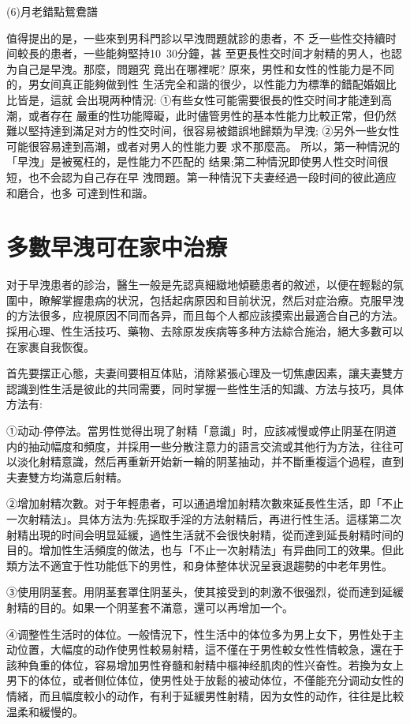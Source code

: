 \documentclass[12pt,UTF8]{ctexbook}
\begin{document}
(6)月老錯點鴛鴦譜

值得提出的是，一些來到男科門診以早洩問題就診的患者，不
乏一些性交持續时间較長的患者，一些能夠堅持10~30分鐘，甚
至更長性交时间才射精的男人，也認为自己是早洩。那麼，問題究
竟出在哪裡呢?
原來，男性和女性的性能力是不同的，男女间真正能夠做到性
生活完全和諧的很少，以性能力为標準的錯配婚姻比比皆是，這就
会出現两种情況:
①有些女性可能需要很長的性交时间才能達到高潮，或者存在
嚴重的性功能障礙，此时儘管男性的基本性能力比較正常，但仍然
難以堅持達到滿足对方的性交时间，很容易被錯誤地歸類为早洩;
②另外一些女性可能很容易達到高潮，或者对男人的性能力要
求不那麼高。
所以，第一种情況的「早洩」是被冤枉的，是性能力不匹配的
结果;第二种情況即使男人性交时间很短，也不会認为自己存在早
洩問題。第一种情況下夫妻经過一段时间的彼此適应和磨合，也多
可達到性和諧。

\section{多數早洩可在家中治療}

对于早洩患者的診治，醫生一般是先認真細緻地傾聽患者的敘述，以便在輕鬆的氛圍中，瞭解掌握患病的状況，包括起病原因和目前状況，然后对症治療。克服早洩的方法很多，应視原因不同而各异，而且每个人都应該摸索出最適合自己的方法。採用心理、性生活技巧、藥物、去除原发疾病等多种方法綜合施治，絕大多數可以在家裹自我恢復。

首先要摆正心態，夫妻间要相互体贴，消除紧張心理及一切焦慮因素，讓夫妻雙方認識到性生活是彼此的共同需要，同时掌握一些性生活的知識、方法与技巧，具体方法有:

①动动-停停法。當男性觉得出現了射精「意識」时，应該减慢或停止阴茎在阴道内的抽动幅度和頻度，并採用一些分散注意力的語言交流或其他行为方法，往往可以淡化射精意識，然后再重新开始新一輪的阴茎抽动，并不斷重複這个過程，直到夫妻雙方均滿意后射精。

②增加射精次數。对于年輕患者，可以通過增加射精次數來延長性生活，即「不止一次射精法」。具体方法为:先採取手淫的方法射精后，再进行性生活。這樣第二次射精出現的时间会明显延緩，過性生活就不会很快射精，從而達到延長射精时间的目的。增加性生活頻度的做法，也与「不止一次射精法」有异曲同工的效果。但此類方法不適宜于性功能低下的男性，和身体整体状況呈衰退趨勢的中老年男性。

③使用阴茎套。用阴茎套罩住阴茎头，使其接受到的刺激不很强烈，從而達到延緩射精的目的。如果一个阴茎套不滿意，還可以再增加一个。

④调整性生活时的体位。一般情況下，性生活中的体位多为男上女下，男性处于主动位置，大幅度的动作使男性較易射精，這不僅在于男性較女性性情較急，還在于該种負重的体位，容易增加男性脊髓和射精中樞神经肌肉的性兴奋性。若換为女上男下的体位，或者侧位体位，使男性处于放鬆的被动体位，不僅能充分调动女性的情緒，而且幅度較小的动作，有利于延緩男性射精，因为女性的动作，往往是比較温柔和緩慢的。
\end{document}
